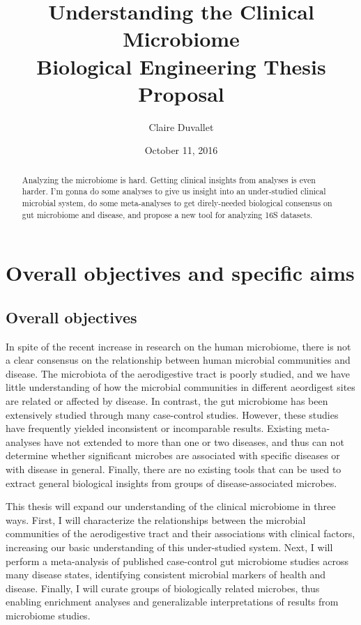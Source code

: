 \documentclass[12pt]{article}
\title{Understanding the Clinical Microbiome \\ Biological Engineering Thesis Proposal}
\author{Claire Duvallet}
\date{October 11, 2016}
\begin{document}
\maketitle
\newpage
\tableofcontents

\begin{abstract}
Analyzing the microbiome is hard. Getting clinical insights from analyses is even harder. I'm gonna do some analyses to give us insight into an under-studied clinical microbial system, do some meta-analyses to get direly-needed biological consensus on gut microbiome and disease, and propose a new tool for analyzing 16S datasets.
\end{abstract}
\newpage

\section{Overall objectives and specific aims}
\subsection{Overall objectives}

In spite of the recent increase in research on the human 
microbiome, there is not a clear consensus on the relationship between 
human microbial communities and disease. The microbiota of 
the aerodigestive tract is poorly studied, and we have little understanding 
of how the microbial communities in different aeordigest sites are related or 
affected by disease. In contrast, the gut microbiome has 
been extensively studied through many case-control studies. 
However, these studies have frequently yielded inconsistent or incomparable 
results. Existing meta-analyses have not extended to more than one or two 
diseases, and thus can not determine whether significant microbes are 
associated with specific diseases or with disease in general. 
Finally, there are no existing tools that can be used to extract general 
biological insights from groups of disease-associated microbes.

This thesis will expand our understanding of the clinical microbiome in three ways.
First, I will characterize the relationships between the microbial communities
of the aerodigestive tract and their associations with clinical factors, 
increasing our basic understanding of this under-studied system.
Next, I will perform a meta-analysis of published case-control gut microbiome studies
across many disease states, identifying consistent microbial markers of health and disease.
Finally, I will curate groups of biologically related microbes, 
thus enabling enrichment analyses and generalizable interpretations
of results from microbiome studies. 
\end{document}
